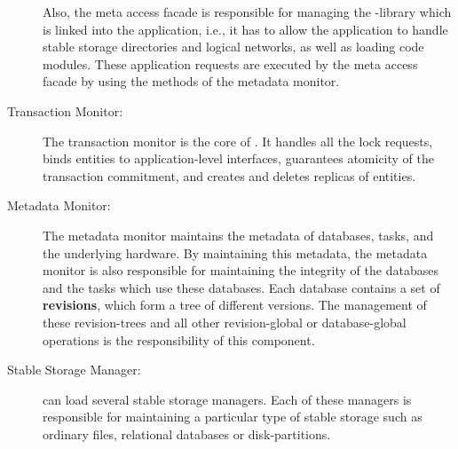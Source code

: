 \documentclass[a4paper, 10pt]{book}
\begin{document}
\begin{description}
                        Also, the meta access facade is responsible for managing the
                        \SYNEIGHT-library which is linked into the application, i.e., it has to
                        allow the application to handle stable storage directories and
                        logical networks, as well as loading code modules. 
                        These application requests are executed by the meta access facade by
                        using the methods of the metadata monitor.
                    \item [Transaction Monitor:] The transaction monitor is the core
                        of \SYNEIGHT. It handles all the lock requests, binds entities to
                        application-level interfaces, guarantees atomicity of the
                        transaction commitment, and creates and deletes replicas of
                        entities.
                    \item [Metadata Monitor:] The metadata monitor maintains the metadata
                        of databases, tasks, and the underlying hardware. By maintaining
                        this metadata, the metadata monitor is also responsible for
                        maintaining the integrity of the databases and the tasks which use
                        these databases.
                        Each database contains a set of \textbf{revisions}, which form a
                        tree of different versions. The management of these revision-trees
                        and all other revision-global or database-global operations is the
                        responsibility of this component. 
                    \item [Stable Storage Manager:] \SYNEIGHT can load several stable storage
                        managers. Each of these managers is responsible for maintaining a
                        particular type of stable storage such as ordinary files, relational
                        databases or disk-partitions.


\end{description}
\end{document}
